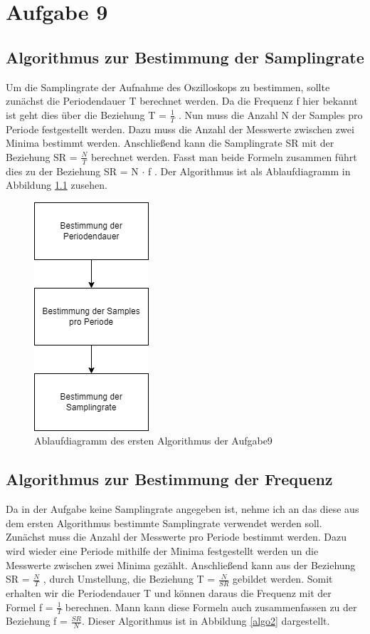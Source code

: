 \chapter{Aufgabe 9}
\section{Algorithmus zur Bestimmung der Samplingrate}
Um die Samplingrate der Aufnahme des Oszilloskops zu bestimmen, sollte zunächst die Periodendauer T berechnet werden.
Da die Frequenz f hier bekannt ist geht dies über die Beziehung T = $\frac{1}{T}$ .
Nun muss die Anzahl N der Samples pro Periode festgestellt werden.
Dazu muss die Anzahl der Messwerte zwischen zwei Minima bestimmt werden.
Anschließend kann die Samplingrate SR mit der Beziehung SR = $\frac{N}{T}$ berechnet werden.
Fasst man beide Formeln zusammen führt dies zu der Beziehung SR = N $\cdot$ f .
Der Algorithmus ist als Ablaufdiagramm in Abbildung \ref{algo1} zusehen. \par 

\begin{figure}[h]
	\centering
	\includegraphics[scale=0.5]{Images/aufgabe9_algo1.png}
	\caption{Ablaufdiagramm des ersten Algorithmus der Aufgabe9}
	\label{algo1}
\end{figure}

\section{Algorithmus zur Bestimmung der Frequenz}
Da in der Aufgabe keine Samplingrate angegeben ist, nehme ich an das diese aus dem ersten Algorithmus bestimmte Samplingrate verwendet werden soll.
Zunächst muss die Anzahl der Messwerte pro Periode bestimmt werden. 
Dazu wird wieder eine Periode mithilfe der Minima festgestellt werden un die Messwerte zwischen zwei Minima gezählt. 
Anschließend kann aus der Beziehung SR = $\frac{N}{T}$ , durch Umstellung, die Beziehung T = $\frac{N}{SR}$ gebildet werden. 
Somit erhalten wir die Periodendauer T und können daraus die Frequenz mit der Formel f = $\frac {1}{T}$ berechnen.
Mann kann diese Formeln auch zusammenfassen zu der Beziehung f = $\frac{SR}{N}.$
Dieser Algorithmus ist in Abbildung \ref{algo2} dargestellt.\par


